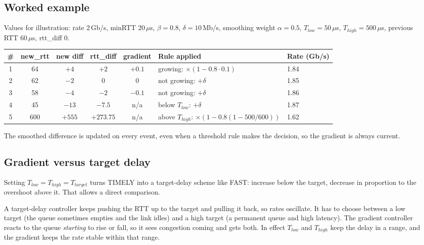 \subsection{Worked example}
Values for illustration: rate 2\,Gb/s, minRTT 20\,$\mu$s, $\beta = 0.8$, $\delta = 10$\,Mb/s, smoothing weight $\alpha = 0.5$,
$T_{low} = 50\,\mu$s, $T_{high} = 500\,\mu$s, previous RTT 60\,$\mu$s, rtt\_diff 0.
\begin{center}
\small
\begin{tabular}{@{}cccccll@{}}
\toprule
\# & new\_rtt & new diff & rtt\_diff & gradient & Rule applied & Rate (Gb/s)\\
\midrule
1 & 64 & $+4$ & $+2$ & $+0.1$ & growing: $\times(1 - 0.8 \cdot 0.1)$ & 1.84\\
2 & 62 & $-2$ & $0$ & $0$ & not growing: $+\delta$ & 1.85\\
3 & 58 & $-4$ & $-2$ & $-0.1$ & not growing: $+\delta$ & 1.86\\
4 & 45 & $-13$ & $-7.5$ & n/a & below $T_{low}$: $+\delta$ & 1.87\\
5 & 600 & $+555$ & $+273.75$ & n/a & above $T_{high}$: $\times(1 - 0.8(1 - 500/600))$ & 1.62\\
\bottomrule
\end{tabular}
\end{center}
The smoothed difference is updated on every event, even when a threshold rule makes the decision, so the gradient is always current.

\subsection{Gradient versus target delay}\label{sec:tmvs}
Setting $T_{low} = T_{high} = T_{target}$ turns TIMELY into a target-delay scheme like FAST: increase below the target, decrease in proportion to
the overshoot above it. That allows a direct comparison.


A target-delay controller keeps pushing the RTT up to the target and pulling it back, so rates oscillate. It has to choose between a low
target (the queue sometimes empties and the link idles) and a high target (a permanent queue and high latency). The gradient controller reacts
to the queue \emph{starting} to rise or fall, so it sees congestion coming and gets both. In effect $T_{low}$ and $T_{high}$ keep the delay in a
range, and the gradient keeps the rate stable within that range.

